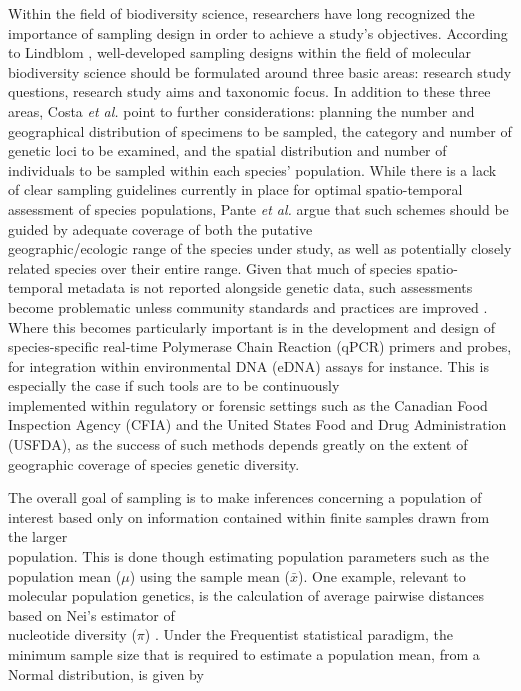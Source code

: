 Within the field of biodiversity science, researchers have long recognized the \\ importance of sampling design in order to achieve a study's objectives. According to Lindblom \cite{lindblom2009sample}, well-developed sampling designs within the field of molecular \\ biodiversity science should be formulated around three basic areas: research study \\ questions, research study aims and taxonomic focus. In addition to these three areas,  Costa \textit{et al.} \cite{costa2015conservation} point to further considerations: planning the number and geographical distribution of specimens to be sampled, the category and number of genetic loci to be examined, and the spatial distribution and number of individuals to be sampled within each species' population. While there is a lack of clear sampling guidelines currently in place for optimal spatio-temporal assessment of species populations, Pante \textit{et al.} \cite{pante2015species} argue that such schemes should be guided by adequate coverage of both the putative \\ geographic/ecologic range of the species under study, as well as potentially closely related species over their entire range. Given that much of species spatio-temporal metadata is not reported alongside genetic data, such assessments become problematic unless community standards and practices are improved \cite{hanner2009data, naaum2015standards, strohm2016mitogenome}. Where this becomes particularly important is in the development and design of species-specific real-time Polymerase Chain Reaction (qPCR) primers and probes, for integration within environmental DNA (eDNA) assays for instance. This is especially the case if such tools are to be continuously \\ implemented within regulatory or forensic settings such as the Canadian Food Inspection Agency (CFIA) \cite{Shehata2018dna} and the United States Food and Drug Administration (USFDA), as the success of such methods depends greatly on the extent of geographic coverage of species genetic diversity.

\vspace{5mm}   

The overall goal of sampling is to make inferences concerning a population of interest based only on information contained within finite samples drawn from the larger \\ population. This is done though estimating population parameters such as the population mean ($\mu$) using the sample mean ($\bar{x}$). One example, relevant to molecular population genetics, is the calculation of average pairwise distances based on Nei's estimator of \\ nucleotide diversity ($\pi$) \cite{nei1979mathematical}. Under the Frequentist statistical paradigm, the minimum sample size that is required to estimate a population mean, from a Normal distribution, is given by \cite{adcock1997sample}

